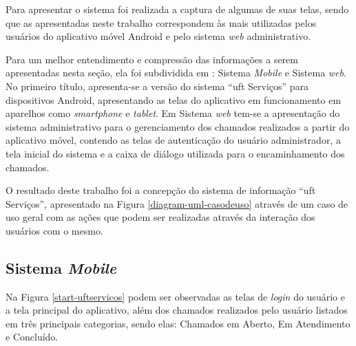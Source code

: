 \noindent Para apresentar o sistema foi realizada a captura de algumas de suas telas, sendo que as apresentadas neste trabalho correspondem às mais utilizadas pelos usuários do aplicativo móvel Android e pelo sistema \textit{web} administrativo.

Para um melhor entendimento e compressão das informações a serem apresentadas nesta seção, ela foi subdividida em : Sistema \textit{Mobile} e Sistema \textit{web}. No primeiro título, apresenta-se a versão do sistema ``\acrshort{uft} Serviços'' para dispositivos Android, apresentando as telas do aplicativo em funcionamento em aparelhos como \textit{smartphone} e \textit{tablet}. Em Sistema \textit{web} tem-se a apresentação do sistema administrativo para o gerenciamento dos chamados realizados a partir do aplicativo móvel, contendo as  telas de autenticação do usuário administrador, a tela inicial do sistema e a caixa de diálogo utilizada para o encaminhamento dos chamados.

O resultado deste trabalho foi a concepção do sistema de informação ``\acrshort{uft} Serviços'', apresentado na Figura \ref{diagram-uml-casodeuso} através de um caso de uso geral com as ações que podem ser realizadas através da interação dos usuários com o mesmo.

\subsection*{Sistema \textit{Mobile}}

\noindent Na Figura \ref{start-uftservicos} podem ser observadas as telas de \textit{login} do usuário e a tela principal do aplicativo, além dos chamados realizados pelo usuário listados em três principais categorias, sendo elas: Chamados em Aberto, Em Atendimento e Concluído.

